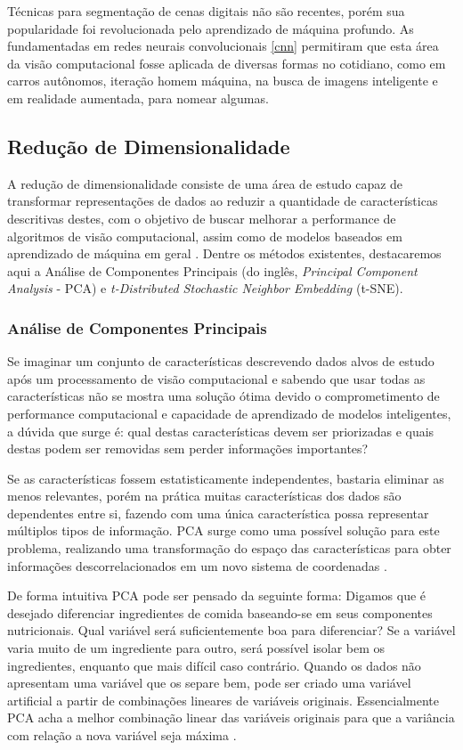 \documentclass[12pt]{report}
\begin{document}
Técnicas para segmentação de cenas digitais não são recentes, porém sua popularidade foi revolucionada pelo aprendizado de máquina profundo. As fundamentadas em redes neurais convolucionais \ref{cnn} permitiram que esta área da visão computacional fosse aplicada de diversas formas no cotidiano, como em carros autônomos, iteração homem máquina, na busca de imagens inteligente e em realidade aumentada, para nomear algumas\cite{garcia-garcia}. 

\subsection{Redução de Dimensionalidade}

A redução de dimensionalidade consiste de uma área de estudo capaz de transformar representações de dados ao reduzir a quantidade de características descritivas destes, com o objetivo de buscar melhorar a performance de algoritmos de visão computacional, assim como de modelos baseados em aprendizado de máquina em geral \cite{stanford}. Dentre os métodos existentes, destacaremos aqui a Análise de Componentes Principais (do inglês, \textit{Principal Component Analysis} - \ac{PCA}) e \textit{t-Distributed Stochastic Neighbor Embedding} (\ac{t-SNE}).

\subsubsection{Análise de Componentes Principais}

Se imaginar um conjunto de características descrevendo dados alvos de estudo após um processamento de visão computacional e sabendo que usar todas as características não se mostra uma solução ótima devido o comprometimento de performance computacional e capacidade de aprendizado de modelos inteligentes, a dúvida que surge é: qual destas características devem ser priorizadas e quais destas podem ser removidas sem perder informações importantes?

Se as características fossem estatisticamente independentes, bastaria eliminar as menos relevantes, porém na prática muitas características dos dados são dependentes entre si, fazendo com uma única característica possa representar múltiplos tipos de informação. \ac{PCA} surge como uma possível solução para este problema, realizando uma transformação do espaço das características para obter informações descorrelacionados em um novo sistema de coordenadas \cite{dummy}.

De forma intuitiva \ac{PCA} pode ser pensado da seguinte forma: Digamos que é desejado diferenciar ingredientes de comida baseando-se em seus componentes nutricionais. Qual variável será suficientemente boa para diferenciar? Se a variável varia muito de um ingrediente para outro, será possível isolar bem os ingredientes, enquanto que mais difícil caso contrário. Quando os dados não apresentam uma variável que os separe bem, pode ser criado uma variável artificial a partir de combinações lineares de variáveis originais. Essencialmente \ac{PCA} acha a melhor combinação linear das variáveis originais para que a variância com relação a nova variável seja máxima \cite{paperspace}.
\end{document}
